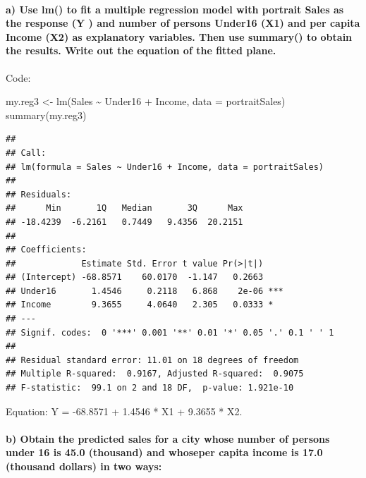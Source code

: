 \documentclass[
]{article}
\newenvironment{Shaded}{\begin{snugshade}}{\end{snugshade}}
\newcommand{\AttributeTok}[1]{\textcolor[rgb]{0.77,0.63,0.00}{#1}}
\newcommand{\FunctionTok}[1]{\textcolor[rgb]{0.00,0.00,0.00}{#1}}
\newcommand{\NormalTok}[1]{#1}
\newcommand{\OtherTok}[1]{\textcolor[rgb]{0.56,0.35,0.01}{#1}}
\newcommand{\SpecialCharTok}[1]{\textcolor[rgb]{0.00,0.00,0.00}{#1}}
\begin{document}
\hypertarget{a-use-lm-to-fit-a-multiple-regression-model-with-portrait-sales-as-the-response-y-and-number-of-persons-under16-x1-and-per-capita-income-x2-as-explanatory-variables.-then-use-summary-to-obtain-the-results.-write-out-the-equation-of-the-fitted-plane.}{%
\paragraph{a) Use lm() to fit a multiple regression model with portrait
Sales as the response (Y ) and number of persons Under16 (X1) and per
capita Income (X2) as explanatory variables. Then use summary() to
obtain the results. Write out the equation of the fitted
plane.}\label{a-use-lm-to-fit-a-multiple-regression-model-with-portrait-sales-as-the-response-y-and-number-of-persons-under16-x1-and-per-capita-income-x2-as-explanatory-variables.-then-use-summary-to-obtain-the-results.-write-out-the-equation-of-the-fitted-plane.}}

\hfill\break
Code:

\begin{Shaded}
\begin{Highlighting}[]
\NormalTok{my.reg3 }\OtherTok{\textless{}{-}} \FunctionTok{lm}\NormalTok{(Sales }\SpecialCharTok{\textasciitilde{}}\NormalTok{ Under16 }\SpecialCharTok{+}\NormalTok{ Income, }\AttributeTok{data =}\NormalTok{ portraitSales)}
\FunctionTok{summary}\NormalTok{(my.reg3)}
\end{Highlighting}
\end{Shaded}

\begin{verbatim}
## 
## Call:
## lm(formula = Sales ~ Under16 + Income, data = portraitSales)
## 
## Residuals:
##      Min       1Q   Median       3Q      Max 
## -18.4239  -6.2161   0.7449   9.4356  20.2151 
## 
## Coefficients:
##             Estimate Std. Error t value Pr(>|t|)    
## (Intercept) -68.8571    60.0170  -1.147   0.2663    
## Under16       1.4546     0.2118   6.868    2e-06 ***
## Income        9.3655     4.0640   2.305   0.0333 *  
## ---
## Signif. codes:  0 '***' 0.001 '**' 0.01 '*' 0.05 '.' 0.1 ' ' 1
## 
## Residual standard error: 11.01 on 18 degrees of freedom
## Multiple R-squared:  0.9167, Adjusted R-squared:  0.9075 
## F-statistic:  99.1 on 2 and 18 DF,  p-value: 1.921e-10
\end{verbatim}

Equation: Y = -68.8571 + 1.4546 * X1 + 9.3655 * X2.

\hypertarget{b-obtain-the-predicted-sales-for-a-city-whose-number-of-persons-under-16-is-45.0-thousand-and-whoseper-capita-income-is-17.0-thousand-dollars-in-two-ways}{%
\paragraph{b) Obtain the predicted sales for a city whose number of
persons under 16 is 45.0 (thousand) and whoseper capita income is 17.0
(thousand dollars) in two
ways:}\label{b-obtain-the-predicted-sales-for-a-city-whose-number-of-persons-under-16-is-45.0-thousand-and-whoseper-capita-income-is-17.0-thousand-dollars-in-two-ways}}
\end{document}
